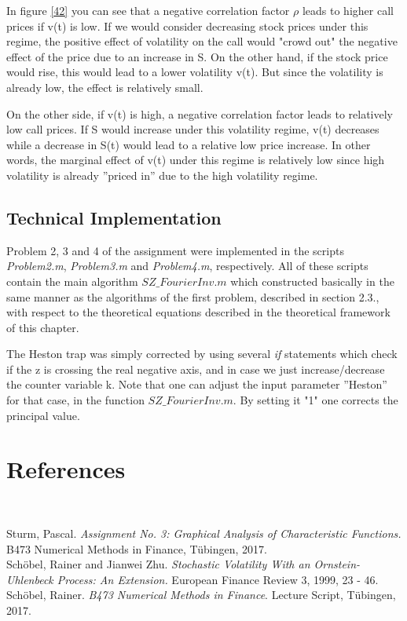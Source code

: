 \documentclass[a4paper,11pt]{article}
\begin{document}
In figure \ref{42} you can see that a negative correlation factor $\rho$ leads to higher call prices if v(t) is low. If we would consider decreasing stock prices under this regime, the positive effect of volatility on the call would "crowd out" the negative effect of the price due to an increase in S. On the other hand, if the stock price would rise, this would lead to a lower volatility v(t). But since the volatility is already low, the effect is relatively small.

On the other side, if v(t) is high, a negative correlation factor leads to relatively low call prices. If S would increase under this volatility regime, v(t) decreases while a decrease in S(t) would lead to a relative low price increase. In other words, the marginal effect of v(t) under this regime is relatively low since high volatility is already ''priced in'' due to the high volatility regime.

\subsection{Technical Implementation}
Problem 2, 3 and 4 of the assignment were implemented in the scripts \textit{Problem2.m}, \textit{Problem3.m} and \textit{Problem4.m}, respectively.
All of these scripts contain the main algorithm \textit{$SZ\_FourierInv.m$} which constructed basically in the same manner as the algorithms of the first problem, described in section 2.3., with respect to the theoretical equations described in the theoretical framework of this chapter. 

The Heston trap was simply corrected by using several \textit{if} statements which check if the z is crossing the real negative axis, and in case we just increase/decrease the counter variable k. Note that one can adjust the input parameter ''Heston'' for that case, in the function \textit{$SZ\_FourierInv.m$}. By setting it "1" one corrects the principal value.

\newpage
\section{References}
\

Sturm, Pascal. \textit{Assignment No. 3: Graphical Analysis of Characteristic Functions.} B473 Numerical Methods in Finance, T\"ubingen, 2017.
\\

Sch\"obel, Rainer and Jianwei Zhu. \textit{Stochastic Volatility With an Ornstein-Uhlenbeck Process: An Extension.} European Finance Review 3, 1999, 23 - 46.
\\

Sch\"obel, Rainer. \textit{B473 Numerical Methods in Finance}. Lecture Script, T\"ubingen, 2017.
\end{document}
